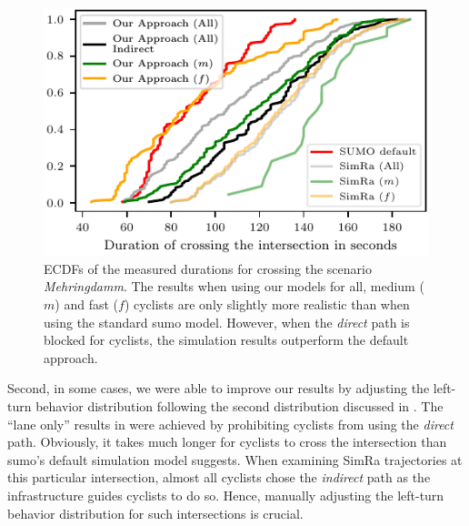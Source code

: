 \begin{figure}
    \centering
    \includegraphics[width=0.7\columnwidth]{fig/im_mehringdamm_ecdf_every.pdf}
    \caption{%
        ECDFs of the measured durations for crossing the scenario \textit{Mehringdamm}.
        The results when using our models for all, medium ($m$) and fast ($f$) cyclists are only slightly more realistic than when using the standard \ac{sumo} model.
        However, when the \textit{direct} path is blocked for cyclists, the simulation results outperform the default approach.
    }%
    \label{fig:im_mehringdamm}
\end{figure}

Second, in some cases, we were able to improve our results by adjusting the left-turn behavior distribution following the second distribution discussed in .
The ``lane only'' results in  were achieved by prohibiting cyclists from using the \textit{direct} path.
Obviously, it takes much longer for cyclists to cross the intersection than \ac{sumo}'s default simulation model suggests.
When examining SimRa trajectories at this particular intersection, almost all cyclists chose the \textit{indirect} path as the infrastructure guides cyclists to do so.
Hence, manually adjusting the left-turn behavior distribution for such intersections is crucial.

